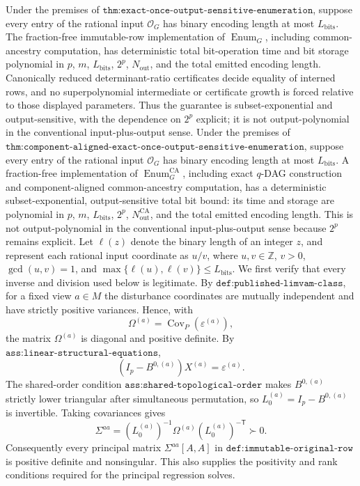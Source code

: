 Under the premises of \(\texttt{thm:exact-once-output-sensitive-enumeration}\), suppose every entry of the rational input \(\mathcal O_G\) has binary encoding length at most \(L_{\mathrm{bits}}\). The fraction-free immutable-row implementation of \(\operatorname{Enum}_G\), including common-ancestry computation, has deterministic total bit-operation time and bit storage polynomial in \(p\), \(m\), \(L_{\mathrm{bits}}\), \(2^p\), \(N_{\mathrm{out}}\), and the total emitted encoding length. Canonically reduced determinant-ratio certificates decide equality of interned rows, and no superpolynomial intermediate or certificate growth is forced relative to those displayed parameters. Thus the guarantee is subset-exponential and output-sensitive, with the dependence on \(2^p\) explicit; it is not output-polynomial in the conventional input-plus-output sense.
Under the premises of \(\texttt{thm:component-aligned-exact-once-output-sensitive-enumeration}\), suppose every entry of the rational input \(\mathcal O_G\) has binary encoding length at most \(L_{\mathrm{bits}}\). A fraction-free implementation of \(\operatorname{Enum}_G^{\mathrm{CA}}\), including exact \(q\)-DAG construction and component-aligned common-ancestry computation, has a deterministic subset-exponential, output-sensitive total bit bound: its time and storage are polynomial in \(p\), \(m\), \(L_{\mathrm{bits}}\), \(2^p\), \(N_{\mathrm{out}}^{\mathrm{CA}}\), and the total emitted encoding length. This is not output-polynomial in the conventional input-plus-output sense because \(2^p\) remains explicit.
Let \(\ell(z)\) denote the binary length of an integer \(z\), and represent each rational input coordinate as \(u/v\), where \(u,v\in\mathbb Z\), \(v>0\), \(\gcd(u,v)=1\), and \(\max\{\ell(u),\ell(v)\}\leq L_{\mathrm{bits}}\).  We first verify that every inverse and division used below is legitimate.  By \(\texttt{def:published-limvam-class}\), for a fixed view \(a\in M\) the disturbance coordinates are mutually independent and have strictly positive variances.  Hence, with
\[
 \Omega^{(a)}=\operatorname{Cov}_P(\varepsilon^{(a)}),
\]
the matrix \(\Omega^{(a)}\) is diagonal and positive definite.  By \(\texttt{ass:linear-structural-equations}\),
\[
 (I_p-B^{0,(a)})X^{(a)}=\varepsilon^{(a)}.
\]
The shared-order condition \(\texttt{ass:shared-topological-order}\) makes \(B^{0,(a)}\) strictly lower triangular after simultaneous permutation, so \(L_0^{(a)}=I_p-B^{0,(a)}\) is invertible.  Taking covariances gives
\[
 \Sigma^{aa}=(L_0^{(a)})^{-1}\Omega^{(a)}(L_0^{(a)})^{-\mathsf T}\succ0.
\tag{1}
\]
Consequently every principal matrix \(\Sigma^{aa}[A,A]\) in \(\texttt{def:immutable-original-row}\) is positive definite and nonsingular.  This also supplies the positivity and rank conditions required for the principal regression solves.

